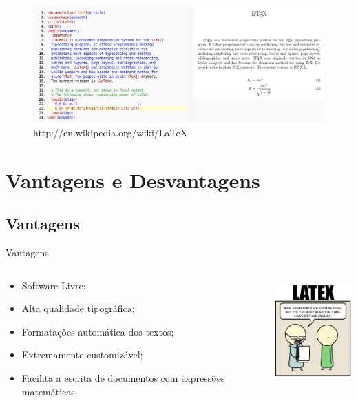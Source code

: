 \begin{frame}
\begin{figure}[htbp]
    \centering
        \includegraphics[width=1\textwidth]{figuras/output.png}
    \caption{http://en.wikipedia.org/wiki/LaTeX}
    \label{fig:output}
\end{figure}
\end{frame}

\section{Vantagens e Desvantagens}
\subsection{Vantagens}
\begin{frame}{Vantagens}
\begin{columns}[T]
    \begin{column}[T]{5cm}
        \begin{itemize}
            \item Software Livre;
            \item Alta qualidade tipográfica;
            \item Formatações automática dos textos;
            \item Extremamente customizável;
            \item Facilita a escrita de documentos com expressões matemáticas.
        \end{itemize}
    \end{column}

    \begin{column}[T]{5cm}
        \centering
        \includegraphics[height=4cm]{figuras/hq.png}
    \end{column}
\end{columns}
\end{frame}

